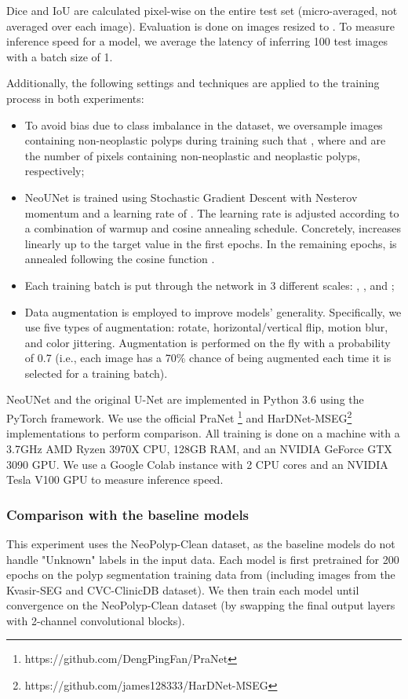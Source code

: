 \documentclass[runningheads]{llncs}
\newcommand{\ModelName}{NeoUNet\xspace}
\newcommand{\CleanDatasetName}{NeoPolyp-Clean\xspace}
\begin{document}
	Dice and IoU are calculated pixel-wise on the entire test set (micro-averaged, not averaged over each image). Evaluation is done on images resized to . To measure inference speed for a model, we average the latency of inferring 100 test images with a batch size of 1.

	Additionally, the following settings and techniques are applied to the training process in both experiments:
	\begin{itemize}
		\item To avoid bias due to class imbalance in the dataset, we oversample images containing non-neoplastic polyps during training such that , where  and  are the number of pixels containing non-neoplastic and neoplastic polyps, respectively;
		\item \ModelName is trained using Stochastic Gradient Descent with Nesterov momentum and a learning rate of . The learning rate  is adjusted according to a combination of warmup and cosine annealing schedule. Concretely,  increases linearly up to the target value in the first  epochs. In the remaining epochs,  is annealed following the cosine function \cite{ilya2016sgdr}.
\item Each training batch is put through the network in 3 different scales: , , and ;
		\item Data augmentation is employed to improve models' generality. Specifically, we use five types of augmentation: rotate, horizontal/vertical flip, motion blur, and color jittering. Augmentation is performed on the fly with a probability of 0.7 (i.e., each image has a 70\% chance of being augmented each time it is selected for a training batch).
	\end{itemize}



	\ModelName and the original U-Net are implemented in Python 3.6 using the PyTorch \cite{NEURIPS2019_9015} framework. We use the official PraNet \footnote{https://github.com/DengPingFan/PraNet} and HarDNet-MSEG\footnote{https://github.com/james128333/HarDNet-MSEG} implementations to perform comparison. All training is done on a machine with a 3.7GHz AMD Ryzen 3970X CPU, 128GB RAM, and an NVIDIA GeForce GTX 3090 GPU. We use a Google Colab instance with 2 CPU cores and an NVIDIA Tesla V100 GPU to measure inference speed.

	\subsubsection{Comparison with the baseline models}
	This experiment uses the \CleanDatasetName dataset, as the baseline models do not handle "Unknown" labels in the input data. Each model is first pretrained for 200 epochs on the polyp segmentation training data from \cite{jha2019resunet++} (including images from the Kvasir-SEG and CVC-ClinicDB dataset). We then train each model until convergence on the \CleanDatasetName dataset (by swapping the final output layers with 2-channel convolutional blocks).
\end{document}
